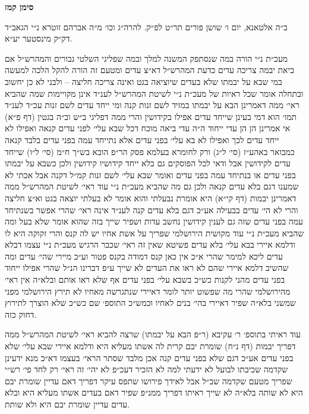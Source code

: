 \documentclass[12pt, openany]{book}
\newcommand{\chapname}{}
\newcommand{\newchap}[1]{
	\addcontentsline{toc}{chapter}{#1}
	\renewcommand{\chapname}{#1}
		\begin{center}
			\textbf{%
\fontsize{16pt}{16pt}\selectfont
				#1}
		\end{center}
}
\begin{document}
\newchap{סימן קמז}
\begin{multicols}{2}
ב״ה אלטאנא, יום ו׳ שושן פורים תר״ט לפ״ק. להרה״ג וכו׳ מ״ה אברהם זוטרא נ״י הגאב״ד דק״ק מינסטער יע״א.\\\vspace{0pt}

מעכ״ת נ״י הורה במה שנסתפק המשנה למלך ובמה שפליגי השלטי גבורים והמהרש״ל אם ביאת יבמה צריכה עדים כדעת המהרש״ל דא״צ עדים ומטעם זה הורה להקל הלכה למעשה במי שבא על יבמתו שלא בעדים שיוציאה בגט ואינה צריכה חליצה – ולבני לא כן יחשוב ובתחלה אומר שכל ראיות של מעכ״ת נ״י לשיטת המהרש״ל לענ״ד אינן מקויימות שמה שהביא ראי׳ ממה דאמרינן הבא על יבמתו במזיד לשם זנות קנה ומי ייחד עדים לשם זנות עכ״ד לענ״ד תמו׳ הוא דמי בעינן שייחד עדים אפילו בקידושין והרי ממה דפליגי ב״ש וב״ה בגטין (דף פ״א) אי אמרינן הן הן עדי ייחוד ה״ה עדי ביאה מוכח דכל שבא עלי׳ לפני עדים קנאה ואפילו לא ייחד עדים לכך ואפילו לא בא עלי׳ בפני עדים אלא נתייחד עמה בפני עדים בלבד קנאה כמבואר באהע״ז (סי׳ ל״ג) ורק לחומרא בעלמא פסק הר״פ הובא בש״ך ח״מ (סי׳ ל״ו) שייחד עדים לקידושין אבל ודאי לכל הפוסקים גם בלא ייחד קידושיו קידושין ולכן כשבא על יבמתו בפני עדים או בנתיחד עמה בפני עדים ואומר שבא עלי׳ לשם זנות קמ״ל דקנה אבל אכתי לא שמענו דגם בלא עדים קנאה ולכן גם מה שהביא מעכ״ת נ״י עוד ראי׳ לשיטת המהרש״ל ממה דאמרינן יבמות (דף קי״א) היא אומרת נבעלתי והוא אומר לא בעלתי יוצאה בגט וא״צ חליצה והרי לא הי׳ עדים בבעילה אע״כ דגם בלא עדים קנה לענ״ד אינה ראי׳ שהרי אפשר בשנתיחד עמה בפני עדים שזה גם לענין קידושין נחשב עדות ושפיר שייך בזה שהוא אומר שלא בעל ומה שהביא מעכ״ת נ״י עוד מקושית הירושלמי שפריך על אשת אחיו יש לה קנס והרי זקוקה היא לו ודלמא איירי בבא עלי׳ בלא עדים פשיטא שאין זה ראי׳ שכבר הרגיש מעכ״ת נ״י עצמו דבלא עדים ליכא למימר שהרי א״כ אין כאן קנס דמודה בקנס פטור וע״כ מיירי שהי׳ עדים ומה שהשיב דלמא איירי שהם לא ראו את העדים לא שייך ע״פ דברינו הנ״ל שהרי אפילו ייחוד בפני עדים מהני לקנות כש״כ בשבא עלי׳ בפני עדים אף שלא ראו אותם ובלא״ה אין ראי׳ מהירושלמי שהרי מה שפשוט יותר לומר דאיירי שנתגרשה מאחיו לא תירץ הירושלמי מפני שמשני בלא״ה שפיר דאיירי בהי׳ בנים לאחיו וכמש״כ התוספ׳ שם כש״כ שלא הוצרך לתירוץ דחוק כזה.\\\vspace{0pt}

עוד ראיתי בתוספ׳ ר׳ עקיבא (ר״פ הבא על יבמתו) שרצה להביא ראי׳ לשיטת המהרש״ל ממה דפריך יבמות (דף נ״ח) שומרת יבם קרית לה אשתו מעליא היא ודלמא איירי שבא עלי׳ שלא בפני עדים אע״כ דגם שלא בפני עדים קנה אכן מלבד שסתר הראי׳ בעצמו דא״כ מנא ידעינן שקדמה שכיבתו לבועל לא ידעתי למה לא הזכיר דעכ״פ לא יהי׳ זה ראי׳ רק לחד פי׳ רש״י שפריך מטעם שקדמה שב״ל אבל לאידך פירושו שתפס עיקר דפריך דאם עדיין שומרת יבם היא לא שותה בלא״ה לא שייך ראיתו דפריך ממנ״פ שפיר דאם בעדים אשתו מעליא היא ובלא עדים עדיין שומרת יבם היא ולא שותת.\\\vspace{0pt}


\end{multicols}
\end{document}
